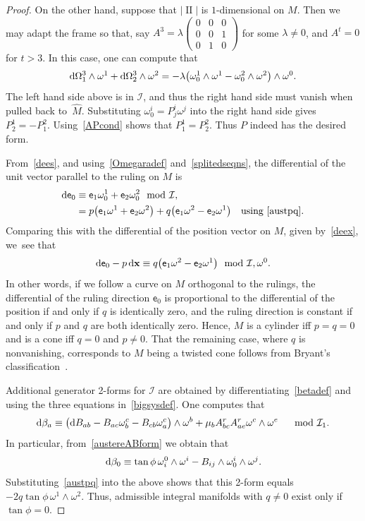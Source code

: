 \documentclass[pdftex]{sigma}
\def\ve{\mathsf{e}}
\def\vx{\boldsymbol{\mathrm{x}}}
\def\II{\operatorname{II}} %
\def\calI{\mathcal{I}}
\def\w{\omega}
\numberwithin{equation}{section}
\begin{document}
\begin{proof}
On the other hand, suppose that $|\II|$ is $1$-dimensional on $M$. Then we may adapt the frame so that, say $A^3 = \lambda \left(\begin{smallmatrix} 0 & 0 & 0 \\
0 & 0 & 1 \\ 0 & 1 & 0 \end{smallmatrix}\right)$ for some $\lambda\ne0$, and $A^t=0$ for $t>3$. In this case, one can compute that
\begin{gather*}
{\rm d} \Omega^3_1 \wedge \w^1 + {\rm d} \Omega^3_2 \wedge \w^2 = -\lambda \big(\w^1_0 \wedge \w^1 - \w^2_0 \wedge \w^2\big) \wedge \w^0.
\end{gather*}
The left hand side above is in $\calI$, and thus the right hand side must vanish when pulled back to~$\widehat{M}$. Substituting $\w^i_0= P^i_j \w^j$ into the right hand side gives $P^1_2 = - P^2_1$. Using~\eqref{APcond} shows that $P_1^1 = P_2^2$. Thus $P$ indeed has the desired form.

From~\eqref{dees}, and using~\eqref{Omegaradef} and~\eqref{splitedseqns}, the differential of the unit vector parallel to the ruling on $M$ is
\begin{align*}
{\rm d}\ve_0 &\equiv \ve_1\w^1_0 + \ve_2 \w^2_0 \mod \calI, \\
&= p \big(\ve_1 \w^1 + \ve_2 \w^2\big) + q \big(\ve_1 \w^2-\ve_2 \w^1\big) \quad \text{using~\eqref{austpq}.}
\end{align*}
Comparing this with the differential of the position vector on $M$, given by~\eqref{deex}, we~see that
\begin{gather*}
{\rm d}\ve_0 - p\, {\rm d}\vx \equiv q \big(\ve_1 \w^2-\ve_2 \w^1\big) \mod \calI, \w^0.
\end{gather*}
In other words, if we follow a curve on $M$ orthogonal to the rulings, the differential of the ruling direction $\ve_0$ is proportional to the differential of the position
if and only if $q$ is identically zero, and the ruling direction is constant if and only if $p$ and $q$ are both identically zero. Hence, $M$ is a cylinder iff $p=q=0$ and is a cone iff $q=0$ and $p\ne 0$. That the remaining case, where $q$ is nonvanishing, corresponds to $M$ being a twisted cone follows from Bryant's classification~\cite{Br}.

Additional generator 2-forms for $\calI$ are obtained by differentiating~\eqref{betadef} and using the three equations in~\eqref{bigsysdef}. One computes that
\begin{gather} \label{dbetacomp}
{\rm d}\beta_a \equiv \big({\rm d}B_{ab} -B_{ac} \w^c_b - B_{cb} \w^c_a\big) \wedge \w^b + \mu_b A^r_{bc} A^r_{ae} \w^c \wedge \w^e \quad \mod \calI_1.
\end{gather}
In particular, from~\eqref{austereABform} we obtain that
\begin{gather*}
{\rm d}\beta_0 \equiv \tan\phi \,\w^0_i \wedge \w^i -B_{ij} \wedge \w^i_0 \wedge \w^j.
\end{gather*}
Substituting~\eqref{austpq} into the above shows that this 2-form equals $-2q \tan \phi \, \w^1 \wedge \w^2$. Thus, admissible integral manifolds with $q\ne 0$ exist only if $\tan\phi=0$.
\end{proof}
\end{document}

